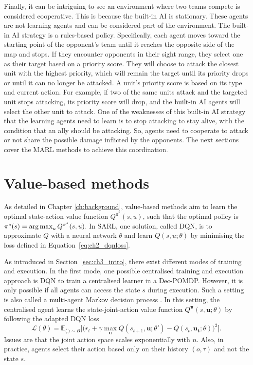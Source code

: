 Finally, it can be intriguing to see an environment where two teams compete is considered cooperative.
This is because the built-in AI is stationary. 
These agents are not learning agents and can be considered part of the environment.
The built-in AI strategy is a rules-based policy.
Specifically, each agent moves toward the starting point of the opponent's team until it reaches the opposite side of the map and stops.
If they encounter opponents in their sight range, they select one as their target based on a priority score.
They will choose to attack the closest unit with the highest priority, which will remain the target until its priority drops or until it can no longer be attacked.
A unit's priority score is based on its type and current action.
For example, if two of the same units attack and the targeted unit stops attacking, its priority score will drop, and the built-in AI agents will select the other unit to attack.
One of the weaknesses of this built-in AI strategy that the learning agents need to learn is to stop attacking to stay alive, with the condition that an ally should be attacking.
So, agents need to cooperate to attack or not share the possible damage inflicted by the opponents.
The next sections cover the MARL methods to achieve this coordination.

\section{Value-based methods}
\label{sec:ch3_value}

As detailed in Chapter \ref{ch:background}, value-based methods aim to learn the optimal state-action value function $Q^{\pi^*}(s, u)$, such that the optimal policy is $\pi^*(s)=\operatorname*{arg\,max}_{u} Q^{\pi^*}(s, u)$.
In SARL, one solution, called DQN, is to approximate $Q$ with a neural network $\theta$ and learn $Q(s, u;\theta)$
by minimising the loss defined in Equation~\ref{eq:ch2_dqnloss}.

As introduced in Section~\ref{sec:ch3_intro}, there exist different modes of training and execution.
In the first mode, one possible centralised training and execution approach is DQN to train a centralised learner in a Dec-POMDP.
However, it is only possible if all agents can access the state $s$ during execution.
Such a setting is also called a multi-agent Markov decision process \citep{boutilier1996planning}.
In this setting, the centralised agent learns the state-joint-action value function $Q^{\boldsymbol{\pi}}(s,\mathbf{u}; \theta)$ by following the adapted DQN loss
\begin{equation}
\label{eq:ch3_centralQloss}
    \mathcal{L}(\theta) = \mathbb{E}_{\langle . \rangle\sim B} \big[\big(r_{t} + \gamma \max_{\mathbf{u}} Q(s_{t+1}, \mathbf{u}; \theta')- Q(s_{t}, \mathbf{\mathbf{u_t}}; \theta)\big)^{2}\big].
\end{equation}
Issues are that the joint action space scales exponentially with $n$.
Also, in practice, agents select their action based only on their history $(o, \tau)$ and not the state $s$.

